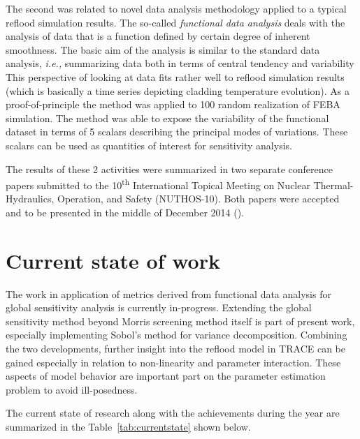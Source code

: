 \documentclass[11pt,titlepage]{article}
\begin{document}
The second was related to novel data analysis methodology applied to a 
typical reflood simulation results.
The so-called \textit{functional data analysis} deals with the 
analysis of data that is a function defined by certain degree of inherent 
smoothness. 
The basic aim of the analysis is similar to the standard data analysis, 
\textit{i.e.,} summarizing data both in terms of central tendency and 
variability 
This perspective of looking at data fits rather well to reflood simulation 
results (which is basically a time series depicting cladding temperature 
evolution).
As a proof-of-principle the method was applied to 100 random realization 
of FEBA simulation.
The method was able to expose the variability of the functional dataset 
in terms of 5 scalars describing the principal modes of variations.
These scalars can be used as quantities of interest for sensitivity 
analysis.

The results of these 2 activities were summarized in two separate conference 
papers submitted to the 10\textsuperscript{th} International Topical Meeting on 
Nuclear Thermal-Hydraulics, Operation, and Safety (NUTHOS-10). 
Both papers were accepted and to be presented in the middle of December 2014 
(\cite{Wicaksono2014d,Wicaksono2014e}).

\section{Current state of work}

The work in application of metrics derived from functional data analysis for global 
sensitivity analysis is currently in-progress.
Extending the global sensitivity method beyond Morris screening method itself is 
part of present work, especially implementing Sobol's method for variance 
decomposition.
Combining the two developments, further insight into the reflood model in 
TRACE can be gained especially in relation to non-linearity and parameter 
interaction.
These aspects of model behavior are important part on the parameter estimation 
problem to avoid ill-posedness.

The current state of research along with the achievements during the year are
summarized in the Table~\ref{tab:currentstate} shown below.
\end{document}
